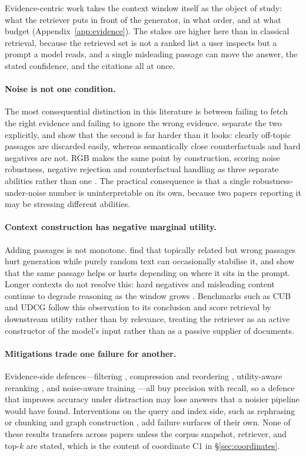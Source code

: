 Evidence-centric work takes the context window itself as the object of study: what the
retriever puts in front of the generator, in what order, and at what budget
(Appendix~\ref{app:evidence}). The stakes are higher here than in classical retrieval,
because the retrieved set is not a ranked list a user inspects but a prompt a model reads,
and a single misleading passage can move the answer, the stated confidence, and the citations
all at once.

\paragraph{Noise is not one condition.}
The most consequential distinction in this literature is between failing to fetch the right
evidence and failing to ignore the wrong evidence. \citet{irrelevantContext2023} separate the
two explicitly, and \citet{raat2024} show that the second is far harder than it looks: clearly
off-topic passages are discarded easily, whereas semantically close counterfactuals and hard
negatives are not. RGB makes the same point by construction, scoring noise robustness,
negative rejection and counterfactual handling as three separate abilities rather than one
\citep{rgb2023}. The practical consequence is that a single robustness-under-noise number is
uninterpretable on its own, because two papers reporting it may be stressing different
abilities.

\paragraph{Context construction has negative marginal utility.}
Adding passages is not monotone. \citet{cuconasu2024powerofnoise} find that topically related
but wrong passages hurt generation while purely random text can occasionally stabilise it, and
\citet{liu2024lostmiddle} show that the same passage helps or hurts depending on where it sits
in the prompt. Longer contexts do not resolve this: hard negatives and misleading content
continue to degrade reasoning as the window grows \citep{rrag039,rrag003}. Benchmarks such as
CUB \citep{rrag032} and UDCG \citep{rrag058} follow this observation to its conclusion and score
retrieval by downstream utility rather than by relevance, treating the retriever as an active
constructor of the model's input rather than as a passive supplier of documents.

\paragraph{Mitigations trade one failure for another.}
Evidence-side defences---filtering \citep{rrag044}, compression and reordering \citep{rrag039},
utility-aware reranking \citep{rrag058}, and noise-aware training \citep{raat2024}---all buy
precision with recall, so a defence that improves accuracy under distraction may lose answers
that a noisier pipeline would have found. Interventions on the query and index side, such as
rephrasing \citep{queryRobustness2025} or chunking and graph construction
\citep{rrag141,rrag051}, add failure surfaces of their own. None of these results transfers
across papers unless the corpus snapshot, retriever, and top-$k$ are stated, which is the
content of coordinate C1 in \S\ref{sec:coordinates}.
